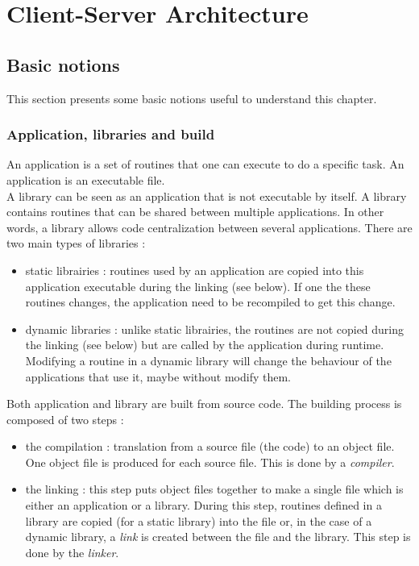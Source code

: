 \chapter{Client-Server Architecture}

\section{Basic notions}

This section presents some basic notions useful to understand this chapter.

\subsection{Application, libraries and build}

An application is a set of routines that one can execute to do a specific task.
An application is an executable file. \\

A library can be seen as an application that is not executable by itself. A
library contains routines that can be shared between multiple applications. In
other words, a library allows code centralization between several applications.
There are two main types of libraries :
\begin{itemize}
 \item static librairies : routines used by an application are copied into this
application executable during the linking (see below). If one the these routines
changes, the application need to be recompiled to get this change.
 \item dynamic libraries : unlike static librairies, the routines are not
copied during the linking (see below) but are called by the application during
runtime. Modifying a routine in a dynamic library will change the behaviour of
the applications that use it, maybe without modify them.
\end{itemize}

Both application and library are built from source code. The building process is
composed of two steps : 
\begin{itemize}
 \item the compilation : translation from a source file (the code) to an object
file. One object file is produced for each source file. This is done by a
\textit{compiler}.
 \item the linking : this step puts object files together to make a single file
which is either an application or a library. During this step, routines defined
in a library are copied (for a static library) into the file or, in the case of
a dynamic library, a \textit{link} is created between the file and the library.
This step is done by the \textit{linker}.
\end{itemize}


